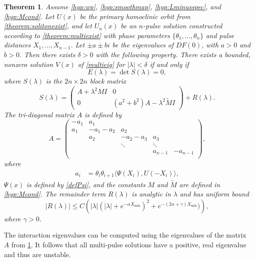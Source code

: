 \documentclass[12pt]{elsarticle}
\newtheorem{theorem}{Theorem}
\begin{document}
\begin{theorem}\label{th:blockmatrix}
Assume \cref{hyp:wp}, \cref{hyp:smoothmap}, \cref{hyp:Lminusspec}, and \cref{hyp:Mcond}. Let $U(x)$ be the primary homoclinic orbit from \cref{theorem:solitonexist}, and let $U_n(x)$ be an $n$-pulse solution constructed according to \cref{theorem:multiexist} with phase parameters $\{ \theta_1, \dots, \theta_n \}$ and pulse distances $X_1, \dots, X_{n-1}$. Let $\pm a \pm bi$ be the eigenvalues of $DF(0)$, with $a > 0$ and $b > 0$. Then there exists $\delta > 0$ with the following property. There exists a bounded, nonzero solution $V(x)$ of \cref{multieig} for $|\lambda| < \delta$ if and only if
\begin{equation}\label{blockmatrixcond}
E(\lambda) = \det S(\lambda) = 0,
\end{equation}
where $S(\lambda)$ is the $2n \times 2n$ block matrix
\begin{equation}\label{blockeq}
S(\lambda) = 
\begin{pmatrix}
A + \lambda^2 M I & 0 \\
0 & (a^2 + b^2) A - \lambda^2 \tilde{M} I
\end{pmatrix} + R(\lambda).
\end{equation}
The tri-diagonal matrix $A$ is defined by
\begin{equation*}
A = \begin{pmatrix}
-a_1 & a_1 \\
a_1 & -a_1 - a_2 &  a_2 \\
& a_2 & -a_2 - a_3 &  a_3 \\
& & \ddots & \ddots \\
& & &  a_{n-1} & -a_{n-1} \\
\end{pmatrix},
\end{equation*}
where
\begin{align*}
a_i &= \theta_i \theta_{i+1} \langle \Psi(X_i), U(-X_i) \rangle,
\end{align*}
$\Psi(x)$ is defined by \cref{defPsi}, and the constants $M$ and $\tilde{M}$ are defined in \cref{hyp:Mcond}. The remainder term $R(\lambda)$ is analytic in $\lambda$ and has uniform bound
\[
|R(\lambda)| \leq C\left( |\lambda|(|\lambda| + e^{-\alpha X_{\min}})^2 + e^{-(2 \alpha + \gamma)X_{\min} }) \right),
\]
where $\gamma > 0$.
\end{theorem}

The interaction eigenvalues can be computed using the eigenvalues of the matrix $A$ from \cref{th:blockmatrix}. It follows that all multi-pulse solutions have a positive, real eigenvalue and thus are unstable. 
\end{document}
